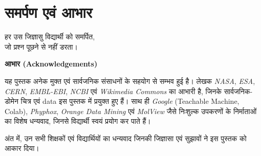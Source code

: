 \chapter*{समर्पण एवं आभार}

\begin{center}
{\cvHH\large\color{cvBlue} हर उस जिज्ञासु विद्यार्थी को समर्पित,\\[2pt]
जो प्रश्न पूछने से नहीं डरता।}
\end{center}

\vspace{1.2cm}

\noindent\textbf{आभार (Acknowledgements)}\par\smallskip
यह पुस्तक अनेक मुक्त एवं सार्वजनिक संसाधनों के सहयोग से सम्भव हुई है। लेखक
\emph{NASA}, \emph{ESA}, \emph{CERN}, \emph{EMBL-EBI}, \emph{NCBI} एवं
\emph{Wikimedia Commons} का आभारी है, जिनके सार्वजनिक-डोमेन चित्र एवं data इस
पुस्तक में प्रयुक्त हुए हैं। साथ ही \emph{Google} (Teachable Machine, Colab),
\emph{Phyphox}, \emph{Orange Data Mining} एवं \emph{MolView} जैसे निःशुल्क
उपकरणों के निर्माताओं का विशेष धन्यवाद, जिनसे विद्यार्थी स्वयं प्रयोग कर पाते हैं।

\smallskip
\noindent अंत में, उन सभी शिक्षकों एवं विद्यार्थियों का धन्यवाद जिनकी जिज्ञासा एवं
सुझावों ने इस पुस्तक को आकार दिया।
